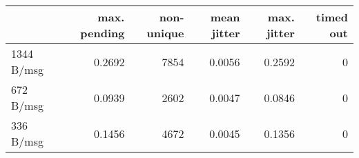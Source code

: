 \begin{tabular}{l|rrrrr}
\rowcolor{gray!50}
 & max. pending & non-unique & mean jitter & max. jitter & timed out\\\hline
1344 B/msg & 0.2692 & 7854 & 0.0056 & 0.2592 & 0 \\
672 B/msg & 0.0939 & 2602 & 0.0047 & 0.0846 & 0 \\
336 B/msg & 0.1456 & 4672 & 0.0045 & 0.1356 & 0 \\
\end{tabular}

